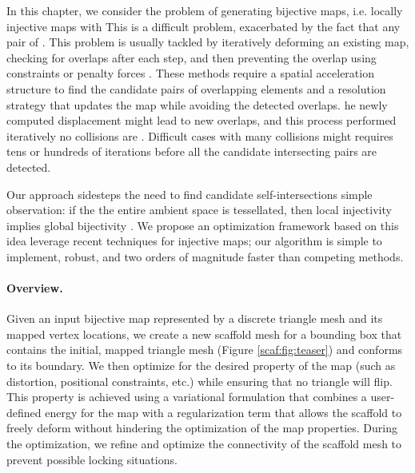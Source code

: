 In this chapter, we consider the problem of generating bijective maps, i.e. locally injective maps with  %
This is a difficult problem, exacerbated by the fact that any pair of . %
This problem is usually tackled by iteratively deforming an existing map, checking for overlaps after each step, and then preventing the overlap using constraints \cite{Harmon:2011} or penalty forces \cite{harmon2010robust}. These methods require a spatial acceleration structure to find the candidate pairs of overlapping elements and a resolution strategy that updates the map while avoiding the detected overlaps. he newly computed displacement might  lead to new overlaps, and this process  performed iteratively  no  collisions are . Difficult cases with many collisions might requires tens or hundreds of iterations before all the candidate intersecting pairs are detected.

Our approach sidesteps the need to find candidate self-intersections  simple observation: if the the entire ambient space  is tessellated, then local injectivity implies global bijectivity \cite{Zhang:2005,Lipman:2013ArXiv,Muller:2015}. We  propose an optimization framework based on this idea  leverage recent techniques for  injective maps; our algorithm is simple to implement, robust, and two orders of magnitude faster than competing methods.

\paragraph{Overview.} Given an input bijective map represented by a discrete triangle mesh and its mapped vertex locations, we create a new scaffold mesh for a bounding box that contains the initial, mapped triangle mesh (Figure \ref{scaf:fig:teaser}) and conforms to its boundary. We then optimize for the desired property of the map (such as distortion, positional constraints, etc.) while ensuring that no triangle will flip. This property is achieved using a variational formulation that combines a user-defined energy for the map with a regularization term that allows the scaffold to freely deform without hindering the optimization of the map properties. During the optimization, we refine and optimize the connectivity of the scaffold mesh to prevent possible locking situations.

